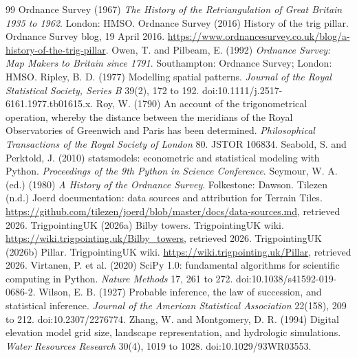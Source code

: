 \documentclass[11pt,a4paper]{article}
\begin{document}
\begin{thebibliography}{99}
 Ordnance Survey (1967) \textit{The History of the Retriangulation of Great Britain 1935 to 1962}. London: HMSO.
 Ordnance Survey (2016) History of the trig pillar. Ordnance Survey blog, 19 April 2016. \url{https://www.ordnancesurvey.co.uk/blog/a-history-of-the-trig-pillar}.
 Owen, T. and Pilbeam, E. (1992) \textit{Ordnance Survey: Map Makers to Britain since 1791}. Southampton: Ordnance Survey; London: HMSO.
 Ripley, B. D. (1977) Modelling spatial patterns. \textit{Journal of the Royal Statistical Society, Series B} 39(2), 172 to 192. doi:10.1111/j.2517-6161.1977.tb01615.x.
 Roy, W. (1790) An account of the trigonometrical operation, whereby the distance between the meridians of the Royal Observatories of Greenwich and Paris has been determined. \textit{Philosophical Transactions of the Royal Society of London} 80. JSTOR 106834.
 Seabold, S. and Perktold, J. (2010) statsmodels: econometric and statistical modeling with Python. \textit{Proceedings of the 9th Python in Science Conference}.
 Seymour, W. A. (ed.) (1980) \textit{A History of the Ordnance Survey}. Folkestone: Dawson.
 Tilezen (n.d.) Joerd documentation: data sources and attribution for Terrain Tiles. \url{https://github.com/tilezen/joerd/blob/master/docs/data-sources.md}, retrieved 2026.
 TrigpointingUK (2026a) Bilby towers. TrigpointingUK wiki. \url{https://wiki.trigpointing.uk/Bilby_towers}, retrieved 2026.
 TrigpointingUK (2026b) Pillar. TrigpointingUK wiki. \url{https://wiki.trigpointing.uk/Pillar}, retrieved 2026.
 Virtanen, P. et al. (2020) SciPy 1.0: fundamental algorithms for scientific computing in Python. \textit{Nature Methods} 17, 261 to 272. doi:10.1038/s41592-019-0686-2.
 Wilson, E. B. (1927) Probable inference, the law of succession, and statistical inference. \textit{Journal of the American Statistical Association} 22(158), 209 to 212. doi:10.2307/2276774.
 Zhang, W. and Montgomery, D. R. (1994) Digital elevation model grid size, landscape representation, and hydrologic simulations. \textit{Water Resources Research} 30(4), 1019 to 1028. doi:10.1029/93WR03553.
\end{thebibliography}
\end{document}
